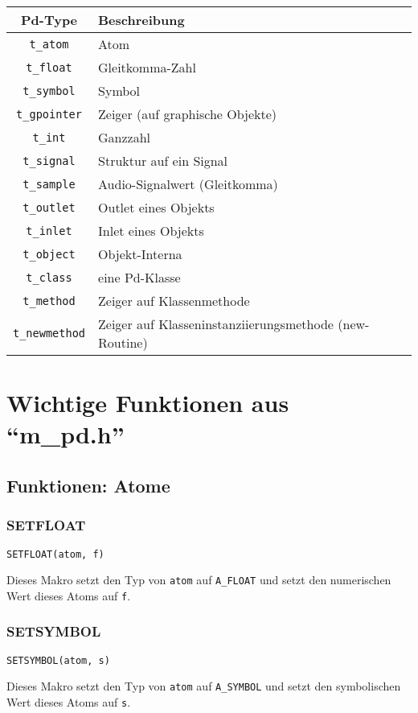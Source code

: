\documentclass[12pt, a4paper,austrian, titlepage]{article}
\begin{document}
\begin{appendix}
\begin{tabular}{c|l}
Pd-Type & Beschreibung \\
\hline\hline
\verb+t_atom+& Atom \\
\verb+t_float+ & Gleitkomma-Zahl \\
\verb+t_symbol+ & Symbol \\
\verb+t_gpointer+ & Zeiger (auf graphische Objekte) \\
\hline
\verb+t_int+ & Ganzzahl \\
\verb+t_signal+ & Struktur auf ein Signal \\
\verb+t_sample+ & Audio-Signalwert (Gleitkomma)\\
\verb+t_outlet+ & Outlet eines Objekts \\
\verb+t_inlet+ & Inlet eines Objekts \\
\verb+t_object+ & Objekt-Interna \\
\hline
\verb+t_class+ & eine Pd-Klasse \\
\verb+t_method+ & Zeiger auf Klassenmethode \\
\verb+t_newmethod+ & Zeiger auf Klasseninstanziierungsmethode (new-Routine) \\
\end{tabular}


\section{Wichtige Funktionen aus ``m\_pd.h''}
\subsection{Funktionen: Atome}

\subsubsection{SETFLOAT}
\begin{verbatim}
SETFLOAT(atom, f)
\end{verbatim}
Dieses Makro setzt den Typ von \verb+atom+ auf \verb+A_FLOAT+
und setzt den numerischen Wert dieses Atoms auf \verb+f+.

\subsubsection{SETSYMBOL}
\begin{verbatim}
SETSYMBOL(atom, s)
\end{verbatim}
Dieses Makro setzt den Typ von \verb+atom+ auf \verb+A_SYMBOL+
und setzt den symbolischen Wert dieses Atoms auf \verb+s+.


\end{appendix}
\end{document}
